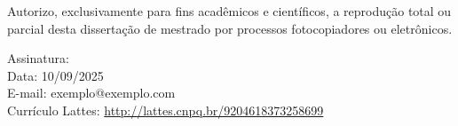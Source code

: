 \begin{titlepage}
    Autorizo, exclusivamente para fins acadêmicos e científicos, a reprodução total ou parcial desta dissertação de mestrado por processos fotocopiadores ou eletrônicos.

    \vspace{2cm}
    Assinatura: \makebox[0.75\textwidth]{\hrulefill} \\
    Data: 10/09/2025 \\
    E-mail: exemplo@exemplo.com \\
    Currículo Lattes: \href{http://lattes.cnpq.br/9204618373258699}{http://lattes.cnpq.br/9204618373258699} \\
    \vfill
    \begin{center}



\end{center}
\end{titlepage}
